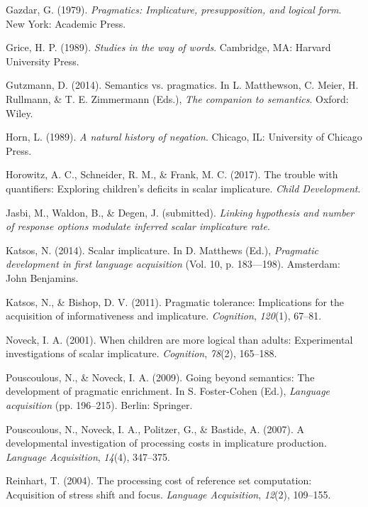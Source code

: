\documentclass[man]{apa6}
\theoremstyle{definition}
\theoremstyle{definition}
\theoremstyle{definition}
\theoremstyle{remark}
\begin{document}
\hypertarget{ref-gazdar79}{}
Gazdar, G. (1979). \emph{Pragmatics: Implicature, presupposition, and
logical form}. New York: Academic Press.

\hypertarget{ref-grice1989studies}{}
Grice, H. P. (1989). \emph{Studies in the way of words}. Cambridge, MA:
Harvard University Press.

\hypertarget{ref-gutzmann2014}{}
Gutzmann, D. (2014). Semantics vs. pragmatics. In L. Matthewson, C.
Meier, H. Rullmann, \& T. E. Zimmermann (Eds.), \emph{The companion to
semantics}. Oxford: Wiley.

\hypertarget{ref-horn1989natural}{}
Horn, L. (1989). \emph{A natural history of negation}. Chicago, IL:
University of Chicago Press.

\hypertarget{ref-horowitz2017trouble}{}
Horowitz, A. C., Schneider, R. M., \& Frank, M. C. (2017). The trouble
with quantifiers: Exploring children's deficits in scalar implicature.
\emph{Child Development}.

\hypertarget{ref-jasbiWaldonDegan2017}{}
Jasbi, M., Waldon, B., \& Degen, J. (submitted). \emph{Linking
hypothesis and number of response options modulate inferred scalar
implicature rate}.

\hypertarget{ref-katsos2014scalar}{}
Katsos, N. (2014). Scalar implicature. In D. Matthews (Ed.),
\emph{Pragmatic development in first language acquisition} (Vol. 10, p.
183---198). Amsterdam: John Benjamins.

\hypertarget{ref-katsos2011pragmatic}{}
Katsos, N., \& Bishop, D. V. (2011). Pragmatic tolerance: Implications
for the acquisition of informativeness and implicature.
\emph{Cognition}, \emph{120}(1), 67--81.

\hypertarget{ref-noveck2001children}{}
Noveck, I. A. (2001). When children are more logical than adults:
Experimental investigations of scalar implicature. \emph{Cognition},
\emph{78}(2), 165--188.

\hypertarget{ref-pouscoulous2009going}{}
Pouscoulous, N., \& Noveck, I. A. (2009). Going beyond semantics: The
development of pragmatic enrichment. In S. Foster-Cohen (Ed.),
\emph{Language acquisition} (pp. 196--215). Berlin: Springer.

\hypertarget{ref-pouscoulous2007developmental}{}
Pouscoulous, N., Noveck, I. A., Politzer, G., \& Bastide, A. (2007). A
developmental investigation of processing costs in implicature
production. \emph{Language Acquisition}, \emph{14}(4), 347--375.

\hypertarget{ref-reinhart2004processing}{}
Reinhart, T. (2004). The processing cost of reference set computation:
Acquisition of stress shift and focus. \emph{Language Acquisition},
\emph{12}(2), 109--155.
\end{document}

